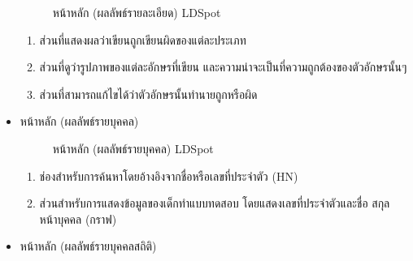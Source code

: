 \documentclass[12pt,oneside,openright,a4paper]{cpe-thai-project}
\begin{document}
\begin{itemize}
\begin{figure}[!ht]
    \caption{หน้าหลัก (ผลลัพธ์รายละเอียด) LDSpot}\label{fig:system}
  \end{figure}
  \begin{enumerate}
    \item ส่วนที่แสดงผลว่าเขียนถูกเขียนผิดของแต่ละประเภท
    \item ส่วนที่ดูว่ารูปภาพของแต่ละอักษรที่เขียน และความน่าจะเป็นที่ความถูกต้องของตัวอักษรนั้นๆ
    \item ส่วนที่สามารถแก้ไขได้ว่าตัวอักษรนั้นทำนายถูกหรือผิด
  \end{enumerate}
  \newpage
  \item หน้าหลัก (ผลลัพธ์รายบุคคล)
  \begin{figure}[!ht]\centering
    \setlength{\fboxrule}{0.2mm} %
    \setlength{\fboxsep}{1cm}
    \caption{หน้าหลัก (ผลลัพธ์รายบุคคล) LDSpot}\label{fig:endgame}
  \end{figure}
  \begin{enumerate}
    \item ช่องสำหรับการค้นหาโดยอ้างอิงจากชื่อหรือเลขที่ประจำตัว (HN)
    \item ส่วนสำหรับการแสดงข้อมูลของเด็กทำแบบทดสอบ โดยแสดงเลขที่ประจำตัวและชื่อ สกุล
    หน้าบุคคล (กราฟ)
  \end{enumerate}
  \newpage
  \item หน้าหลัก (ผลลัพธ์รายบุคคลสถิติ)
  \begin{figure}[!ht]\centering
    \setlength{\fboxrule}{0.2mm} %
    \setlength{\fboxsep}{1cm}

\end{figure}
\end{itemize}
\end{document}
